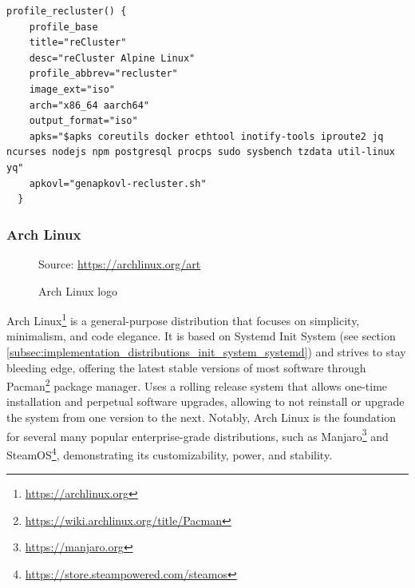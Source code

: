 \begin{lstlisting}[language=shell, morekeywords={[2]{profile_recluster, profile_base}}, morekeywords={[4]{title, desc, profile_abbrev, image_ext, arch, output_format, apks, apkovl}}, xleftmargin=\parindent, label={lst:alpine}, caption=Contents of \texttt{mkimg.recluster.sh} file which shows the reCluster profile definition]
  profile_recluster() {
    profile_base
    title="reCluster"
    desc="reCluster Alpine Linux"
    profile_abbrev="recluster"
    image_ext="iso"
    arch="x86_64 aarch64"
    output_format="iso"
    apks="$apks coreutils docker ethtool inotify-tools iproute2 jq ncurses nodejs npm postgresql procps sudo sysbench tzdata util-linux yq"
    apkovl="genapkovl-recluster.sh"
  }
\end{lstlisting}

\subsubsection{Arch Linux}
\label{subsubsec:implementation_distributions_iso_arch_linux}

\begin{figure} %
  \centering
  \def\stackalignment{r} %
  {\scriptsize \parbox[t]{\linewidth}{ Source: \url{https://archlinux.org/art}} }
  \caption{Arch Linux logo}
\end{figure}

Arch Linux\footnote{\url{https://archlinux.org}} is a general-purpose
distribution that focuses on simplicity, minimalism, and code elegance. It is based
on Systemd Init System (see section
\ref{subsec:implementation_distributions_init_system_systemd}) and strives to stay
bleeding edge, offering the latest stable versions of most software through
Pacman\footnote{\url{https://wiki.archlinux.org/title/Pacman}} package manager. Uses
a rolling release system that allows one-time installation and perpetual software
upgrades, allowing to not reinstall or upgrade the system from one version to
the next. Notably, Arch Linux is the foundation for several many popular
enterprise-grade distributions, such as Manjaro\footnote{\url{https://manjaro.org}}
and SteamOS\footnote{\url{https://store.steampowered.com/steamos}},
demonstrating its customizability, power, and stability\cite{arch_linux}.

